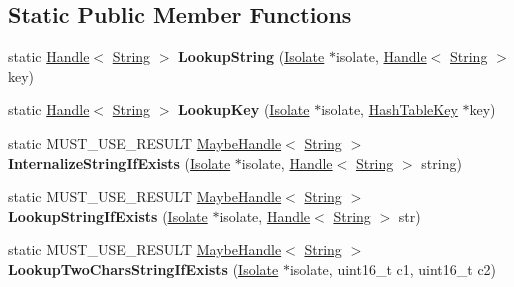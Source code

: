 \subsection*{Static Public Member Functions}
\begin{DoxyCompactItemize}
\item 
\hypertarget{classv8_1_1internal_1_1_string_table_a1e5bbfa11d1d3e127cf8040931b9e55e}{}static \hyperlink{classv8_1_1internal_1_1_handle}{Handle}$<$ \hyperlink{classv8_1_1internal_1_1_string}{String} $>$ {\bfseries Lookup\+String} (\hyperlink{classv8_1_1internal_1_1_isolate}{Isolate} $\ast$isolate, \hyperlink{classv8_1_1internal_1_1_handle}{Handle}$<$ \hyperlink{classv8_1_1internal_1_1_string}{String} $>$ key)\label{classv8_1_1internal_1_1_string_table_a1e5bbfa11d1d3e127cf8040931b9e55e}

\item 
\hypertarget{classv8_1_1internal_1_1_string_table_a764dd5a6358422bace060c88d83153af}{}static \hyperlink{classv8_1_1internal_1_1_handle}{Handle}$<$ \hyperlink{classv8_1_1internal_1_1_string}{String} $>$ {\bfseries Lookup\+Key} (\hyperlink{classv8_1_1internal_1_1_isolate}{Isolate} $\ast$isolate, \hyperlink{classv8_1_1internal_1_1_hash_table_key}{Hash\+Table\+Key} $\ast$key)\label{classv8_1_1internal_1_1_string_table_a764dd5a6358422bace060c88d83153af}

\item 
\hypertarget{classv8_1_1internal_1_1_string_table_a5509f3ee730f00ea06a3f739314c2774}{}static M\+U\+S\+T\+\_\+\+U\+S\+E\+\_\+\+R\+E\+S\+U\+L\+T \hyperlink{classv8_1_1internal_1_1_maybe_handle}{Maybe\+Handle}$<$ \hyperlink{classv8_1_1internal_1_1_string}{String} $>$ {\bfseries Internalize\+String\+If\+Exists} (\hyperlink{classv8_1_1internal_1_1_isolate}{Isolate} $\ast$isolate, \hyperlink{classv8_1_1internal_1_1_handle}{Handle}$<$ \hyperlink{classv8_1_1internal_1_1_string}{String} $>$ string)\label{classv8_1_1internal_1_1_string_table_a5509f3ee730f00ea06a3f739314c2774}

\item 
\hypertarget{classv8_1_1internal_1_1_string_table_aa7e11f1d3d9f1de7ba5d278dd28ee063}{}static M\+U\+S\+T\+\_\+\+U\+S\+E\+\_\+\+R\+E\+S\+U\+L\+T \hyperlink{classv8_1_1internal_1_1_maybe_handle}{Maybe\+Handle}$<$ \hyperlink{classv8_1_1internal_1_1_string}{String} $>$ {\bfseries Lookup\+String\+If\+Exists} (\hyperlink{classv8_1_1internal_1_1_isolate}{Isolate} $\ast$isolate, \hyperlink{classv8_1_1internal_1_1_handle}{Handle}$<$ \hyperlink{classv8_1_1internal_1_1_string}{String} $>$ str)\label{classv8_1_1internal_1_1_string_table_aa7e11f1d3d9f1de7ba5d278dd28ee063}

\item 
\hypertarget{classv8_1_1internal_1_1_string_table_af4c75301d2ce7b54118523a1b0764b1f}{}static M\+U\+S\+T\+\_\+\+U\+S\+E\+\_\+\+R\+E\+S\+U\+L\+T \hyperlink{classv8_1_1internal_1_1_maybe_handle}{Maybe\+Handle}$<$ \hyperlink{classv8_1_1internal_1_1_string}{String} $>$ {\bfseries Lookup\+Two\+Chars\+String\+If\+Exists} (\hyperlink{classv8_1_1internal_1_1_isolate}{Isolate} $\ast$isolate, uint16\+\_\+t c1, uint16\+\_\+t c2)\label{classv8_1_1internal_1_1_string_table_af4c75301d2ce7b54118523a1b0764b1f}

\end{DoxyCompactItemize}

